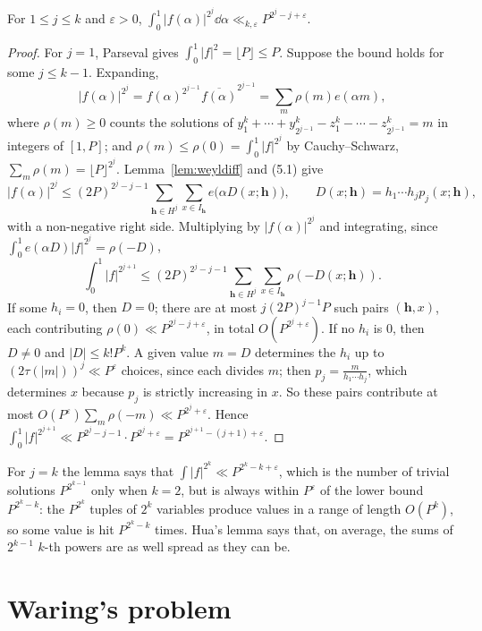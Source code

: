 \begin{theorem}[Hua, 1938]\label{thm:hua}
For $1\le j\le k$ and $\varepsilon>0$, $\displaystyle\int_0^1|f(\alpha)|^{2^j}\dd\alpha\ll_{k,\varepsilon}P^{2^j-j+\varepsilon}$.
\end{theorem}
\begin{proof}
For $j=1$, Parseval gives $\int_0^1|f|^2=\lfloor P\rfloor\le P$. Suppose the bound holds for some $j\le k-1$. Expanding,
\[
|f(\alpha)|^{2^j}=f(\alpha)^{2^{j-1}}\overline{f(\alpha)}^{2^{j-1}}=\sum_m\rho(m)e(\alpha m),
\]
where $\rho(m)\ge0$ counts the solutions of $y_1^k+\cdots+y_{2^{j-1}}^k-z_1^k-\cdots-z_{2^{j-1}}^k=m$ in integers of $[1,P]$; and $\rho(m)\le\rho(0)=\int_0^1|f|^{2^j}$ by Cauchy--Schwarz, $\sum_m\rho(m)=\lfloor P\rfloor^{2^j}$. Lemma~\ref{lem:weyldiff} and (5.1) give
\[
|f(\alpha)|^{2^j}\le(2P)^{2^j-j-1}\sum_{\mathbf h\in H^j}\sum_{x\in I_{\mathbf h}}e\bigl(\alpha D(x;\mathbf h)\bigr),\qquad D(x;\mathbf h)=h_1\cdots h_jp_j(x;\mathbf h),
\]
with a non-negative right side. Multiplying by $|f(\alpha)|^{2^j}$ and integrating, since $\int_0^1e(\alpha D)|f|^{2^j}=\rho(-D)$,
\[
\int_0^1|f|^{2^{j+1}}\le(2P)^{2^j-j-1}\sum_{\mathbf h\in H^j}\sum_{x\in I_{\mathbf h}}\rho(-D(x;\mathbf h)).
\]
If some $h_i=0$, then $D=0$; there are at most $j(2P)^{j-1}P$ such pairs $(\mathbf h,x)$, each contributing $\rho(0)\ll P^{2^j-j+\varepsilon}$, in total $O(P^{2^j+\varepsilon})$. If no $h_i$ is $0$, then $D\ne0$ and $|D|\le k!P^k$. A given value $m=D$ determines the $h_i$ up to $(2\tau(|m|))^j\ll P^\varepsilon$ choices, since each divides $m$; then $p_j=\frac m{h_1\cdots h_j}$, which determines $x$ because $p_j$ is strictly increasing in $x$. So these pairs contribute at most $O(P^\varepsilon)\sum_m\rho(-m)\ll P^{2^j+\varepsilon}$. Hence $\int_0^1|f|^{2^{j+1}}\ll P^{2^j-j-1}\cdot P^{2^j+\varepsilon}=P^{2^{j+1}-(j+1)+\varepsilon}$.
\end{proof}

For $j=k$ the lemma says that $\int|f|^{2^k}\ll P^{2^k-k+\varepsilon}$, which is the number of trivial solutions $P^{2^{k-1}}$ only when $k=2$, but is always within $P^\varepsilon$ of the lower bound $P^{2^k-k}$: the $P^{2^k}$ tuples of $2^k$ variables produce values in a range of length $O(P^k)$, so some value is hit $P^{2^k-k}$ times. Hua's lemma says that, on average, the sums of $2^{k-1}$ $k$-th powers are as well spread as they can be.

\section{Waring's problem}

